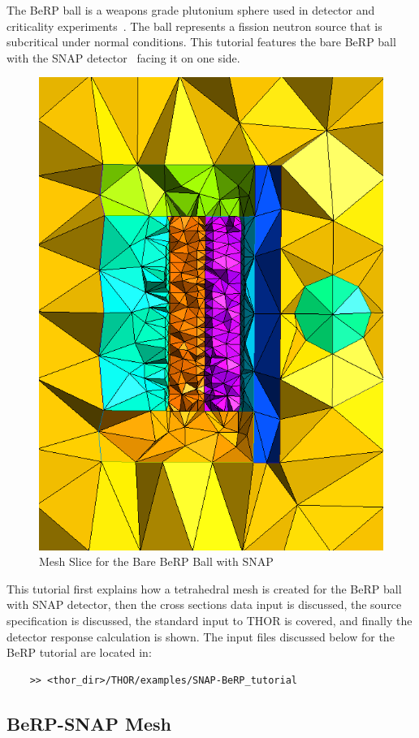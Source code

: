 The BeRP ball is a weapons grade plutonium sphere used in detector and criticality experiments~\cite{BeRP_report}.
The ball represents a fission neutron source that is subcritical under normal conditions.
This tutorial features the bare BeRP ball with the SNAP detector~\cite{snapdetector} facing it on one side.

\begin{figure}[th]
  \includegraphics[height=1.0\textwidth, angle=90]{chapters/tutorials/figures/berp_snap_mesh.png}
  \caption{Mesh Slice for the Bare BeRP Ball with SNAP}
  \label{fig:berp_snap_mesh}
\end{figure}

This tutorial first explains how a tetrahedral mesh is created for the BeRP ball with SNAP detector, then the cross sections data input is discussed, the source specification is discussed, the standard input to THOR is covered, and finally the detector response calculation is shown.
The input files discussed below for the BeRP tutorial are located in:
\begin{verbatim}
    >> <thor_dir>/THOR/examples/SNAP-BeRP_tutorial
\end{verbatim}

\subsection{BeRP-SNAP Mesh}\label{ch:tuts:sec:berpsnap:ssec:mesh}

